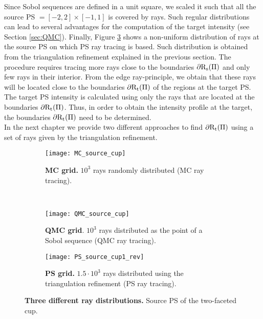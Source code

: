 Since Sobol sequences are defined in a unit square, we scaled it such that all the source PS $=[-2, 2]\times[-1, 1]$ is covered by rays. Such regular distributions can lead to several advantages for the computation of the target intensity (see Section \ref{sec:QMC}). Finally, Figure \ref{fig:ps_sample} shows a non-uniform distribution of rays at the source PS on which PS ray tracing is based. Such distribution is obtained from the triangulation refinement explained in the previous section. The procedure requires tracing more rays close to the boundaries $\partial\mbox{$\textup{R}$}_\textrm{s}(\Pi)$ and only few rays in their interior. From the edge ray-principle, we obtain that these rays will be located close to the boundaries $\partial\mbox{$\textup{R}$}_\textrm{t}(\Pi)$ of the regions at the target PS. The target PS intensity is calculated using only the rays that are located at the boundaries $\partial\mbox{$\textup{R}$}_\textrm{t}(\Pi)$. Thus, in order to obtain the intensity profile at the target, the boundaries $\partial\mbox{$\textup{R}$}_\textrm{t}(\Pi)$ need to be determined.\\ \indent 
In the next chapter we provide two different approaches to find $\partial\mbox{$\textup{R}$}_\textrm{t}(\Pi)$ using a set of rays given by the triangulation refinement.
\begin{figure}[h]
 \begin{subfigure}[t]{\textwidth}
\centering
    \texttt{[image: MC\_source\_cup]}
    \caption{\textbf{MC grid.} $10^3$ rays randomly distributed (MC ray tracing).}
    \label{fig:mc_sample}
\end{subfigure}
\hfill
\\
\begin{subfigure}[t]{\textwidth}
\centering
    \texttt{[image: QMC\_source\_cup]}
    \caption{\textbf{QMC grid}. $10^3$ rays distributed as the point of a Sobol sequence (QMC ray tracing).}
    \label{fig:qmc_sample}
\end{subfigure}
\hfill
\begin{subfigure}[t]{\textwidth}
\centering
\texttt{[image: PS\_source\_cup1\_rev]}
\caption{\textbf{PS grid.} $1.5\cdot10^3$ rays distributed using the triangulation refinement (PS ray tracing).}
\label{fig:ps_sample}
\end{subfigure}
\caption{\textbf{Three different ray distributions.} Source PS of the two-faceted cup.}
\label{fig:three_distributions}
\end{figure}

